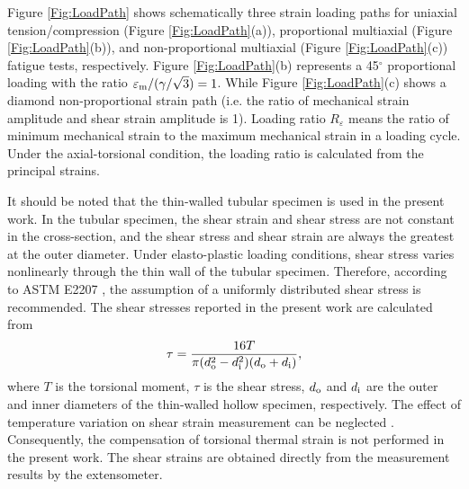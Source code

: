 \documentclass[preprint,5p,twocolumn,11pt,sort&compress]{elsarticle}
\begin{document}
Figure \ref{Fig:LoadPath} shows schematically three strain loading paths for uniaxial tension/compression (Figure \ref{Fig:LoadPath}(a)), proportional multiaxial (Figure \ref{Fig:LoadPath}(b)), and non-proportional multiaxial (Figure \ref{Fig:LoadPath}(c)) fatigue tests, respectively. Figure \ref{Fig:LoadPath}(b) represents a 45$^\circ$ proportional loading with the ratio $\varepsilon_{\rm m}/(\gamma/\sqrt{3})=1$. While Figure \ref{Fig:LoadPath}(c) shows a diamond non-proportional strain path (i.e. the ratio of mechanical strain amplitude and shear strain amplitude is 1). Loading ratio $R_\varepsilon$ means the ratio of minimum mechanical strain to the maximum mechanical strain in a loading cycle. Under the axial-torsional condition, the loading ratio is calculated from the principal strains. 

It should be noted that the thin-walled tubular specimen is used in the present work. In the tubular specimen, the shear strain and shear stress are not constant in the cross-section, and the shear stress and shear strain are always the greatest at the outer diameter. Under elasto-plastic loading conditions, shear stress varies nonlinearly through the thin wall of the tubular specimen. Therefore, according to ASTM E2207 \cite{ASTM2014}, the assumption of a uniformly distributed shear stress is recommended. The shear stresses reported in the present work are calculated from
\begin{equation}
\tau=\frac{16T}{\pi(d_{\rm o}^2-d_{\rm i}^2)(d_{\rm o}+d_{\rm i})},
\end{equation}
where $T$ is the torsional moment, $\tau$ is the shear stress, $d_{\rm o}$ and $d_{\rm i}$ are the outer and inner diameters of the thin-walled hollow specimen, respectively. The effect of temperature variation on shear strain measurement can be neglected \cite{Bakis2014}. Consequently, the compensation of torsional thermal strain is not performed in the present work. The shear strains are obtained directly from the measurement results by the extensometer.

\end{document}
